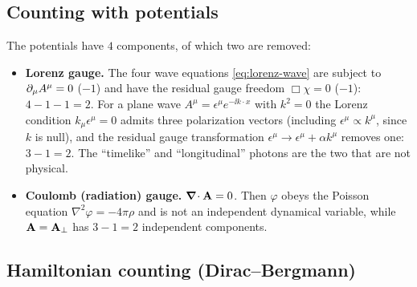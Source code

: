 \subsection{Counting with potentials}

The potentials have $4$ components, of which two are removed:
\begin{itemize}
\item \textbf{Lorenz gauge.}  The four wave equations \eqref{eq:lorenz-wave}
  are subject to $\partial_\mu A^\mu=0$ ($-1$) and have the residual gauge
  freedom $\Box\chi=0$ ($-1$): $4-1-1=2$.  For a plane wave
  $A^\mu=\epsilon^\mu e^{-\ii k\cdot x}$ with $k^2=0$ the Lorenz condition
  $k_\mu\epsilon^\mu=0$ admits three polarization vectors (including
  $\epsilon^\mu\propto k^\mu$, since $k$ is null), and the residual gauge
  transformation $\epsilon^\mu\to\epsilon^\mu+\alpha k^\mu$ removes one:
  $3-1=2$.  The ``timelike'' and ``longitudinal'' photons are the two
  that are not physical.
\item \textbf{Coulomb (radiation) gauge.}  $\boldsymbol{\nabla}\!\cdot\mathbf{A}=0$.  Then $\varphi$ obeys
  the Poisson equation $\nabla^2\varphi=-4\pi\rho$ and is not an independent
  dynamical variable, while $\mathbf{A}=\mathbf{A}_\perp$ has $3-1=2$ independent
  components.
\end{itemize}

\subsection{Hamiltonian counting (Dirac--Bergmann)}

